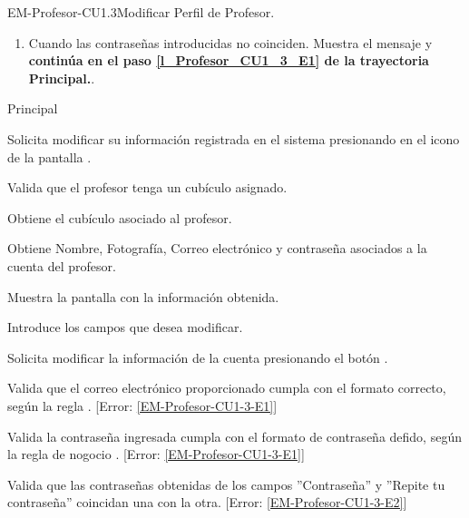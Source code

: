 \begin{UseCase}{EM-Profesor-CU1.3}{Modificar Perfil de Profesor.}
{\begin{enumerate}
			\item \label{EM-Profesor-CU1-3-E2} Cuando las contraseñas introducidas no coinciden. Muestra el mensaje  y \textbf{continúa en el paso \ref{l_Profesor_CU1_3_E1} de la trayectoria Principal.}.
		\end{enumerate}
	}
\end{UseCase}

\begin{UCtrayectoria}{Principal}

	\UCpaso [\UCactor] Solicita modificar su información registrada en el sistema
	presionando en el icono  de la pantalla .

	\UCpaso Valida que el profesor tenga un cubículo asignado.  

	\UCpaso Obtiene el cubículo asociado al profesor. 

	\UCpaso Obtiene Nombre, Fotografía, Correo electrónico y contraseña
	asociados a la cuenta del profesor. \label{l_EM_Profesor_CU1_3_SinCubo}

	\UCpaso Muestra la pantalla  con la información obtenida. 

	\UCpaso[\UCactor] Introduce los campos que desea modificar. \label{l_Profesor_CU1_3_E1}

	\UCpaso [\UCactor] Solicita modificar la información de la cuenta
	presionando el botón .
	
	\UCpaso Valida que el correo electrónico proporcionado cumpla con el formato correcto, según la regla . [Error: \ref{EM-Profesor-CU1-3-E1}]

    \UCpaso Valida la contraseña ingresada cumpla con el formato de contraseña defido, según la regla de nogocio . [Error: \ref{EM-Profesor-CU1-3-E1}]

    \UCpaso Valida que las contraseñas obtenidas de los campos ''Contraseña'' y ''Repite tu contraseña'' coincidan una con la otra. [Error: \ref{EM-Profesor-CU1-3-E2}]


\end{UCtrayectoria}
